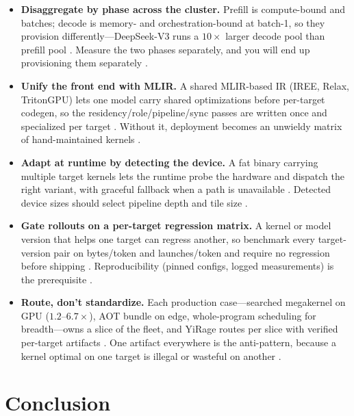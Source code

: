 \begin{itemize}
\item \textbf{Disaggregate by phase across the cluster.}
Prefill is compute-bound and batches; decode is memory- and orchestration-bound at batch-1, so they provision differently---DeepSeek-V3 runs a $10\times$ larger decode pool than prefill pool \citep{patel2025llminference,taxbreak2026}. Measure the two phases separately, and you will end up provisioning them separately \citep{kwon2023vllm}.

\item \textbf{Unify the front end with MLIR.}
A shared MLIR-based IR (IREE, Relax, TritonGPU) lets one model carry shared optimizations before per-target codegen, so the residency/role/pipeline/sync passes are written once and specialized per target \citep{iree2024,lai2023relax}. Without it, deployment becomes an unwieldy matrix of hand-maintained kernels \citep{yirage2026}.

\item \textbf{Adapt at runtime by detecting the device.}
A fat binary carrying multiple target kernels lets the runtime probe the hardware and dispatch the right variant, with graceful fallback when a path is unavailable \citep{iree2024,rotem2018glow}. Detected device sizes should select pipeline depth and tile size \citep{nvidia2022hopper}.

\item \textbf{Gate rollouts on a per-target regression matrix.}
A kernel or model version that helps one target can regress another, so benchmark every target-version pair on bytes/token and launches/token and require no regression before shipping \citep{taxbreak2026,memoryfloor2026}. Reproducibility (pinned configs, logged measurements) is the prerequisite \citep{dlbook}.

\item \textbf{Route, don't standardize.}
Each production case---searched megakernel on GPU ($1.2$--$6.7\times$), AOT bundle on edge, whole-program scheduling for breadth---owns a slice of the fleet, and YiRage routes per slice with verified per-target artifacts \citep{mpk2025,rotem2018glow,yirage2026}. One artifact everywhere is the anti-pattern, because a kernel optimal on one target is illegal or wasteful on another \citep{amd2024xdna}.
\end{itemize}

\section{Conclusion}
\label{sec:ch24_conclusion}

